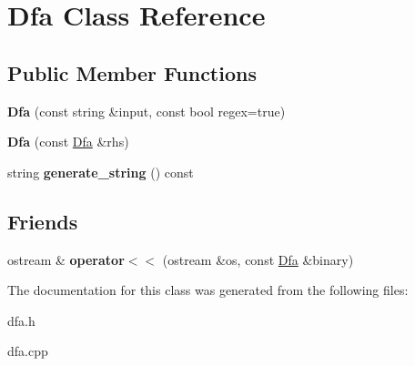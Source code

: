\hypertarget{classDfa}{}\section{Dfa Class Reference}
\label{classDfa}
\subsection*{Public Member Functions}
\begin{DoxyCompactItemize}
\item 
\mbox{\label{classDfa_a59dd37385355563396b30bb49c3c14e8}} 
{\bfseries Dfa} (const string \&input, const bool regex=true)
\item 
\mbox{\label{classDfa_ac7331e3b489095899aea020cfd16e470}} 
{\bfseries Dfa} (const \mbox{\hyperlink{classDfa}{Dfa}} \&rhs)
\item 
\mbox{\label{classDfa_ad2dee4d0a993c3bd86459dc3105646f0}} 
string {\bfseries generate\+\_\+string} () const
\end{DoxyCompactItemize}
\subsection*{Friends}
\begin{DoxyCompactItemize}
\item 
\mbox{\label{classDfa_a45054ea814979ad1ecf4b32facfcf60b}} 
ostream \& {\bfseries operator$<$$<$} (ostream \&os, const \mbox{\hyperlink{classDfa}{Dfa}} \&binary)
\end{DoxyCompactItemize}


The documentation for this class was generated from the following files\+:\begin{DoxyCompactItemize}
\item 
dfa.\+h\item 
dfa.\+cpp\end{DoxyCompactItemize}
